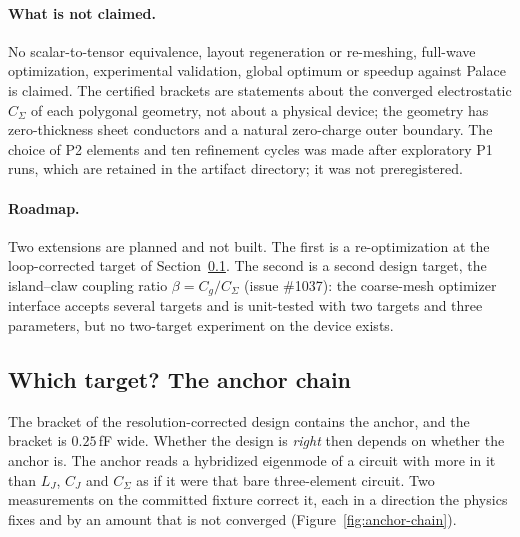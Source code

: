 \documentclass{anvil-paper}
\begin{document}
\paragraph{What is not claimed.}
No scalar-to-tensor equivalence, layout regeneration or re-meshing,
full-wave optimization, experimental validation, global optimum or
speedup against Palace is claimed. The certified brackets are
statements about the converged electrostatic $C_\Sigma$ of each
polygonal geometry, not about a physical device; the geometry has
zero-thickness sheet conductors and a natural zero-charge outer
boundary. The choice of P2 elements and ten refinement cycles was made
after exploratory P1 runs, which are retained in the artifact directory;
it was not preregistered.

\paragraph{Roadmap.}
Two extensions are planned and not built. The first is a re-optimization
at the loop-corrected target of Section~\ref{sec:anchor-chain}. The
second is a second design target, the island--claw coupling ratio
$\beta = C_g/C_\Sigma$ (issue \#1037): the coarse-mesh optimizer
interface accepts several targets and is unit-tested with two targets
and three parameters, but no two-target experiment on the device exists.

\subsection{Which target? The anchor chain}
\label{sec:anchor-chain}

The bracket of the resolution-corrected design contains the anchor,
and the bracket is $0.25$\,fF wide. Whether the design is \emph{right}
then depends on whether the anchor is. The anchor reads a hybridized
eigenmode of a circuit with more in it than $L_J$, $C_J$ and $C_\Sigma$
as if it were that bare three-element circuit. Two measurements on the
committed fixture correct it, each in a direction the physics fixes and
by an amount that is not converged (Figure~\ref{fig:anchor-chain}).
\end{document}

